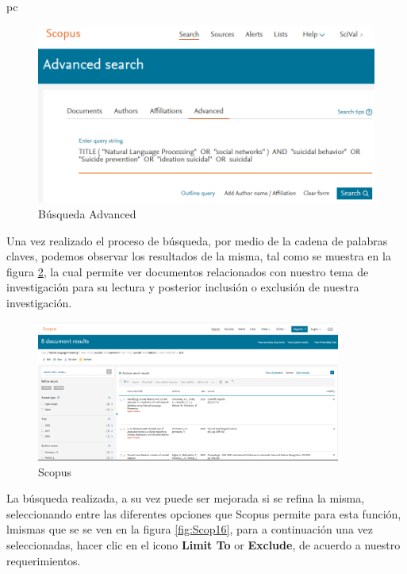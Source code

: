 pc\documentclass[a4paper,12pt,openany]{book}
\begin{document}
\begin{itemize}
\begin{itemize}
        \begin{figure}[H]
        \centering
        \includegraphics[width=12cm]{Scop14.png}
        \caption{Búsqueda Advanced}
        \label{fig:scop14}
        \end{figure}    

\end{itemize}

Una vez realizado el proceso de búsqueda, por medio de la cadena de palabras claves, podemos observar los resultados de la misma, tal como se muestra en la figura \ref{fig:scop15}, la cual permite ver documentos relacionados con nuestro tema de investigación para su lectura y posterior inclusión o exclusión de nuestra investigación.

        \begin{figure}[H]
        \centering
    	\includegraphics[width=10cm]{Scop15.png}
        \caption{Scopus}
        \label{fig:scop15}
        \end{figure}

La búsqueda realizada, a su vez puede ser mejorada si se refina la misma, seleccionando entre las diferentes opciones que Scopus permite para esta función, lmismas que se se ven en la figura \ref{fig:Scop16}, para a continuación una vez seleccionadas, hacer clic en el icono \textbf{Limit To} or \textbf{Exclude}, de acuerdo a nuestro requerimientos.



\end{itemize}
\end{document}
